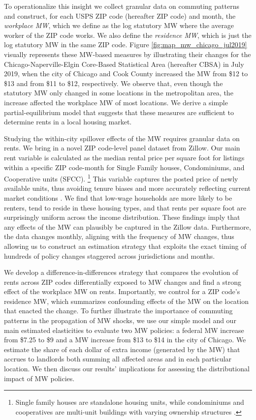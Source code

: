 To operationalize this insight we collect granular data on commuting patterns 
and construct, for each USPS ZIP code (hereafter ZIP code) and month,
the \textit{workplace MW}, which we define as the log statutory MW where
the average worker of the ZIP code works.
We also define the \textit{residence MW}, which is just the log statutory MW in 
the same ZIP code.
Figure \ref{fig:map_mw_chicago_jul2019} visually represents these MW-based 
measures by illustrating their changes for the Chicago-Naperville-Elgin 
Core-Based Statistical Area (hereafter CBSA) in July 2019,
when the city of Chicago and Cook County increased the MW from \$12 to \$13 and 
from \$11 to \$12, respectively.
We observe that, even though the statutory MW only changed in some locations in
the metropolitan area, the increase affected the workplace MW of most locations.
We derive a simple partial-equilibrium model that suggests that these 
measures are sufficient to determine rents in a local housing market.

Studying the within-city spillover effects of the MW requires granular data on 
rents. 
We bring in a novel ZIP code-level panel dataset from Zillow.
Our main rent variable is calculated as the median rental price per square foot 
for listings within a specific ZIP code-month for Single Family houses, 
Condominiums, and Cooperative units (SFCC).%
\footnote{Single family houses are standalone housing units, while condominiums 
    and cooperatives are multi-unit buildings with varying ownership structures 
    \parencite{ZillowTypesOfHomes}.}
This variable captures the posted price of newly available units, 
thus avoiding tenure biases and more accurately reflecting current market 
conditions \parencite{AmbroseEtAl2015}.
We find that low-wage households are more likely to be renters,
tend to reside in these housing types,
and that rents per square foot are surprisingly uniform across the income 
distribution.
These findings imply that any effects of the MW can plausibly be captured 
in the Zillow data.
Furthermore, the data changes monthly, aligning with the frequency of MW 
changes, thus allowing us to construct an estimation strategy that exploits the 
exact timing of hundreds of policy changes staggered across jurisdictions and 
months.

We develop a difference-in-differences strategy that compares the evolution of 
rents across ZIP codes differentially exposed to MW changes and find a strong 
effect of the workplace MW on rents.
Importantly, we control for a ZIP code's residence MW, which summarizes
confounding effects of the MW on the location that enacted the change.
To further illustrate the importance of commuting patterns in the propagation 
of MW shocks, we use our simple model and our main estimated elasticities to 
evaluate two MW policies: 
a federal MW increase from \$7.25 to \$9 and
a MW increase from \$13 to \$14 in the city of Chicago.
We estimate the share of each dollar of extra income (generated by the MW) that 
accrues to landlords both summing all affected areas and in each particular 
location.
We then discuss our results' implications for assessing the distributional 
impact of MW policies.

